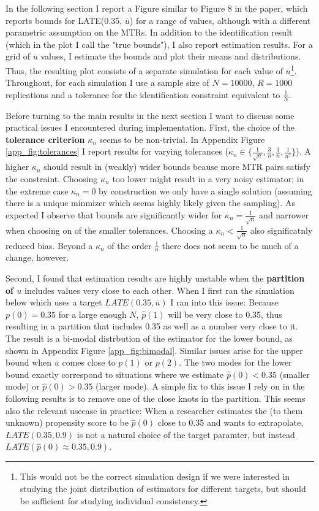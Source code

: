 \documentclass{article}
\begin{document}
In the following section I report a Figure similar to Figure 8 in the paper, which reports bounds for LATE(0.35, $\overline{u}$) for a range of values, although with a different parametric assumption on the MTRs.
In addition to the identification result (which in the plot I call the "true bounds"), I also report estimation results.
For a grid of $\overline{u}$ values, I estimate the bounds and plot their means and distributions. Thus, the resulting plot consists of a separate simulation for each value of $\overline{u}$\footnote{This would not be the correct simulation design if we were interested in studying the joint distribution of estimators for different targets, but should be sufficient for studying individual consistency.}.
Throughout, for each simulation I use a sample size of $N=10000$, $R=1000$ replications and a tolerance for the identification constraint equivalent to $\frac{1}{N}$.

Before turning to the main results in the next section I want to discuss some practical issues I encountered during implementation. 
First, the choice of the \textbf{tolerance criterion} $\kappa_n$ seems to be non-trivial. In Appendix Figure \ref{app_fig:tolerances} I report results for varying tolerances ($\kappa_n \in \{\frac{1}{\sqrt{n}}, \frac{3}{n}, \frac{1}{n}, \frac{1}{n^2}\}$).
A higher $\kappa_n$ should result in (weakly) wider bounds beause more MTR pairs satisfy the constraint. Choosing $\kappa_n$ too lower might result in a very noisy estimator; in the extreme case $\kappa_n = 0$ by construction we only have a single solution (assuming there is a unique minmizer which seems highly likely given the sampling).
As expected I observe that bounds are significantly wider for $\kappa_n = \frac{1}{\sqrt{n}}$ and narrower when choosing on of the smaller tolerances. Choosing a $\kappa_n<\frac{1}{\sqrt{n}}$ also significatnly reduced bias. 
Beyond a $\kappa_n$ of the order $\frac{1}{n}$ there does not seem to be much of a change, however.

Second, I found that estimation results are highly unstable when the \textbf{partition of $u$} includes values very close to each other. 
When I first ran the simulation below which uses a target $LATE(0.35, \overline{u})$ I ran into this issue:
Because $p(0) = 0.35$ for a large enough $N$, $\hat{p}(1)$ will be very close to 0.35, thus resulting in a partition that includes 0.35 as well as a number very close to it.
The result is a bi-modal distrbution of the estimator for the lower bound, as shown in Appendix Figure \ref{app_fig:bimodal}. Similar issues arise for the upper bound when $\overline{u}$ comes close to $p(1)$ or $p(2)$.
The two modes for the lower bound exactly correspond to situations where we estimate $\hat{p}(0) < 0.35$ (smaller mode) or $\hat{p}(0) > 0.35$ (larger mode).
A simple fix to this issue I rely on in the following results is to remove one of the close knots in the partition. 
This seems also the relevant usecase in practice: When a researcher estimates the (to them unknown) propensity score to be $\hat{p}(0)$ close to 0.35 and wants to extrapolate, $LATE(0.35, 0.9)$ is not a natural choice of the target paramter, but instead $LATE(\hat{p}(0)\approx0.35, 0.9)$.
\end{document}
